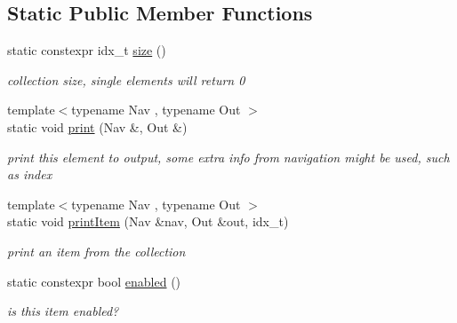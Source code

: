\subsection*{Static Public Member Functions}
\begin{DoxyCompactItemize}
\item 
\mbox{\label{structEmpty_afaea8ad71a5e27dbc56c6b6a5a7dc31f}} 
static constexpr idx\+\_\+t \hyperlink{structEmpty_afaea8ad71a5e27dbc56c6b6a5a7dc31f}{size} ()
\begin{DoxyCompactList}\small\item\em collection size, single elements will return 0 \end{DoxyCompactList}\item 
\mbox{\label{structEmpty_ac7dd4689998c86287e66f6184b521ea0}} 
{\footnotesize template$<$typename Nav , typename Out $>$ }\\static void \hyperlink{structEmpty_ac7dd4689998c86287e66f6184b521ea0}{print} (Nav \&, Out \&)
\begin{DoxyCompactList}\small\item\em print this element to output, some extra info from navigation might be used, such as index \end{DoxyCompactList}\item 
\mbox{\label{structEmpty_a7fb2720be72c6c1ab282eb6546b89aad}} 
{\footnotesize template$<$typename Nav , typename Out $>$ }\\static void \hyperlink{structEmpty_a7fb2720be72c6c1ab282eb6546b89aad}{print\+Item} (Nav \&nav, Out \&out, idx\+\_\+t)
\begin{DoxyCompactList}\small\item\em print an item from the collection \end{DoxyCompactList}\item 
\mbox{\label{structEmpty_a4a4a935a0441e462d0d8814108bdad22}} 
static constexpr bool \hyperlink{structEmpty_a4a4a935a0441e462d0d8814108bdad22}{enabled} ()
\begin{DoxyCompactList}\small\item\em is this item enabled? \end{DoxyCompactList}\item 
\mbox{\label{structEmpty_adc2d105531fb7b43f60fcd9deaaaa71c}} 

\end{DoxyCompactItemize}
